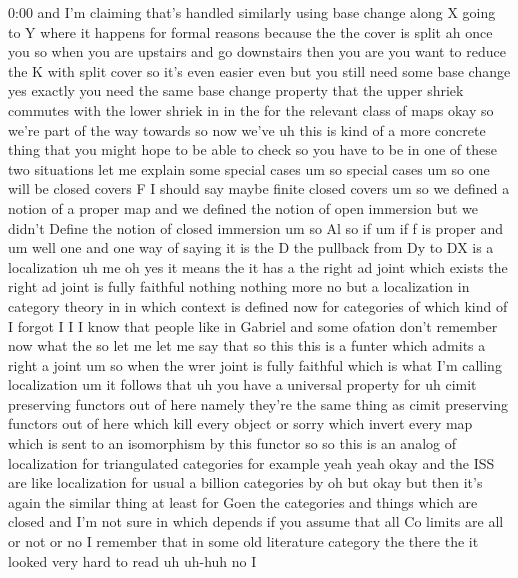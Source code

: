 \begin{unfinished}{0:00}
and  I'm  claiming  that's  handled
similarly  using  base  change  along  X
going  to  Y  where  it  happens  for  formal
reasons  because  the  the  cover  is
split  ah  once  you  so  when  you  are
upstairs  and  go  downstairs  then  you  are
you  want  to  reduce  the  K  with  split
cover  so  it's  even  easier  even  but  you
still  need  some  base  change  yes  exactly
you  need  the  same  base  change  property
that  the  upper  shriek  commutes  with  the
lower  shriek  in  in  the  for  the  relevant
class  of
maps  okay
so  we're  part  of  the  way  towards  so  now
we've  uh  this  is  kind  of  a  more  concrete
thing  that  you  might  hope  to  be  able  to
check  so  you  have  to  be  in  one  of  these
two  situations  let  me  explain  some
special  cases
um
so  special
cases
um  so  one  will  be  closed
covers  F  I  should  say  maybe  finite
closed
covers
um  so  we  defined  a  notion  of  a  proper
map  and  we  defined  the  notion  of  open
immersion  but  we  didn't  Define  the
notion  of  closed
immersion  um  so  Al
so  if
um  if  f  is
proper  and  um  well  one  and  one  way  of
saying  it  is  the  D  the  pullback  from  Dy
to  DX  is  a
localization
uh  me  oh  yes  it  means  the  it  has  a  the
right  ad  joint  which  exists  the  right  ad
joint  is  fully
faithful  nothing  nothing
more
no  but  a  localization  in  category  theory
in  in  which  context  is  defined  now  for
categories
of
which  kind  of  I  forgot  I  I  I  know  that
people  like  in  Gabriel  and  some  ofation
don't  remember  now  what  the  so  let  me
let  me  say  that  so  this  this  is  a  funter
which  admits  a  right  a  joint  um  so  when
the  wrer  joint  is  fully  faithful  which
is  what  I'm  calling  localization
um  it  follows  that  uh  you  have  a
universal  property
for  uh  cimit  preserving  functors  out  of
here  namely  they're  the  same  thing  as
cimit  preserving  functors  out  of  here
which  kill  every  object  or  sorry  which
invert  every  map  which  is  sent  to  an
isomorphism  by  this  functor
so  so  this  is  an  analog  of  localization
for  triangulated  categories  for  example
yeah
yeah  okay
and  the  ISS  are  like  localization  for
usual  a  billion  categories  by  oh  but
okay  but  then  it's  again  the  similar
thing  at  least  for  Goen  the  categories
and  things  which  are  closed  and  I'm  not
sure  in  which  depends  if  you  assume  that
all  Co  limits  are  all  or  not
or  no  I  remember  that  in  some  old
literature  category  the  there  the  it
looked  very  hard  to  read  uh  uh-huh  no  I

\end{unfinished}
